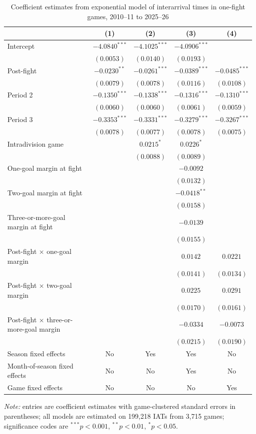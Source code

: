 \begin{table}[!h]
\centering
\caption{Coefficient estimates from exponential model of interarrival times in one-fight games, 2010--11 to 2025--26}
\label{tab:iat_regression_20102011_20252026}
\scriptsize
\renewcommand{\arraystretch}{1.12}
\setlength{\tabcolsep}{5pt}

\begin{tabular*}{\textwidth}{@{\extracolsep{\fill}}lcccc}
\toprule
 & (1) & (2) & (3) & (4) \\
\midrule
Intercept & $-4.0840^{***}$ & $-4.1025^{***}$ & $-4.0906^{***}$ &  \\
 & $(0.0053)$ & $(0.0140)$ & $(0.0193)$ &  \\
Post-fight & $-0.0230^{**}$ & $-0.0261^{***}$ & $-0.0389^{***}$ & $-0.0485^{***}$ \\
 & $(0.0079)$ & $(0.0078)$ & $(0.0116)$ & $(0.0108)$ \\
Period 2 & $-0.1350^{***}$ & $-0.1338^{***}$ & $-0.1316^{***}$ & $-0.1310^{***}$ \\
 & $(0.0060)$ & $(0.0060)$ & $(0.0061)$ & $(0.0059)$ \\
Period 3 & $-0.3353^{***}$ & $-0.3331^{***}$ & $-0.3279^{***}$ & $-0.3267^{***}$ \\
 & $(0.0078)$ & $(0.0077)$ & $(0.0078)$ & $(0.0075)$ \\
Intradivision game &  & $0.0215^{*}$ & $0.0226^{*}$ &  \\
 &  & $(0.0088)$ & $(0.0089)$ &  \\
One-goal margin at fight &  &  & $-0.0092$ &  \\
 &  &  & $(0.0132)$ &  \\
Two-goal margin at fight &  &  & $-0.0418^{**}$ &  \\
 &  &  & $(0.0158)$ &  \\
Three-or-more-goal margin at fight &  &  & $-0.0139$ &  \\
 &  &  & $(0.0155)$ &  \\
Post-fight $\times$ one-goal margin &  &  & $0.0142$ & $0.0221$ \\
 &  &  & $(0.0141)$ & $(0.0134)$ \\
Post-fight $\times$ two-goal margin &  &  & $0.0225$ & $0.0291$ \\
 &  &  & $(0.0170)$ & $(0.0161)$ \\
Post-fight $\times$ three-or-more-goal margin &  &  & $-0.0334$ & $-0.0073$ \\
 &  &  & $(0.0215)$ & $(0.0190)$ \\
\midrule
Season fixed effects & No & Yes & Yes & No \\
Month-of-season fixed effects & No & No & Yes & No \\
Game fixed effects & No & No & No & Yes \\
\bottomrule
\end{tabular*}

\vspace{0.4em}
\parbox{0.95\textwidth}{
\footnotesize
\textit{Note:} entries are coefficient estimates with game-clustered standard errors in parentheses; all models are estimated on 199,218 IATs from 3,715 games; significance codes are $^{***}p<0.001$, $^{**}p<0.01$, $^{*}p<0.05$.
}
\end{table}
